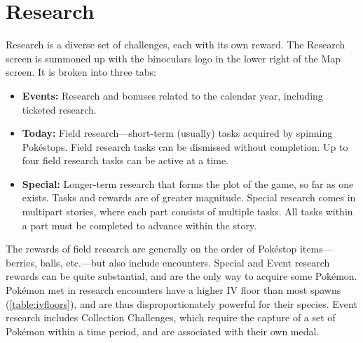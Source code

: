 \section{Research}
\label{sec:research}
Research is a diverse set of challenges, each with its own reward.
The Research screen is summoned up with the binoculars logo in the lower right of the Map screen.
It is broken into three tabs:
\begin{itemize}
  \item \textbf{Events:} Research and bonuses related to the calendar year, including ticketed research.
  \item \textbf{Today:} Field research---short-term (usually) tasks acquired by spinning Pokéstops.
            Field research tasks can be dismissed without completion.
            Up to four field research tasks can be active at a time.
  \item \textbf{Special:} Longer-term research that forms the plot of the game, so far as
            one exists. Tasks and rewards are of greater magnitude.
            Special research comes in multipart stories, where each part consists of multiple tasks.
            All tasks within a part must be completed to advance within the story.
\end{itemize}
The rewards of field research are generally on the order of Pokéstop items---berries, balls,
 etc.---but also include encounters.
Special and Event research rewards can be quite substantial, and are the only way to acquire some Pokémon.
Pokémon met in research encounters have a higher IV floor than most spawns (\autoref{table:ivfloors}),
  and are thus disproportionately powerful for their species.
Event research includes Collection Challenges, which require the capture of a set of Pokémon
  within a time period, and are associated with their own medal.
